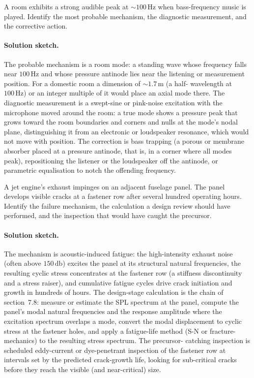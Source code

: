 \begin{exercise}
A room exhibits a strong audible peak at $\sim 100\,\si{\hertz}$
when bass-frequency music is played. Identify the most probable
mechanism, the diagnostic measurement, and the corrective action.
\paragraph{Solution sketch.} The probable mechanism is a room mode: a
standing wave whose frequency falls near $100\,\si{\hertz}$ and whose
pressure antinode lies near the listening or measurement position. For
a domestic room a dimension of $\sim 1.7\,\si{\meter}$ (a half-
wavelength at $100\,\si{\hertz}$) or an integer multiple of it would
place an axial mode there. The diagnostic measurement is a swept-sine
or pink-noise excitation with the microphone moved around the room: a
true mode shows a pressure peak that grows toward the room boundaries
and corners and nulls at the mode's nodal plane, distinguishing it
from an electronic or loudspeaker resonance, which would not move with
position. The correction is bass trapping (a porous or membrane
absorber placed at a pressure antinode, that is, in a corner where all
modes peak), repositioning the listener or the loudspeaker off the
antinode, or parametric equalisation to notch the offending frequency.
\end{exercise}

\begin{exercise}
A jet engine's exhaust impinges on an adjacent fuselage panel. The
panel develops visible cracks at a fastener row after several
hundred operating hours. Identify the failure mechanism, the
calculation a design review should have performed, and the
inspection that would have caught the precursor.
\paragraph{Solution sketch.} The mechanism is acoustic-induced
fatigue: the high-intensity exhaust noise (often above
$150\,\si{\decibel}$) excites the panel at its structural natural
frequencies, the resulting cyclic stress concentrates at the fastener
row (a stiffness discontinuity and a stress raiser), and cumulative
fatigue cycles drive crack initiation and growth in hundreds of hours.
The design-stage calculation is the chain of section~7.8: measure or
estimate the SPL spectrum at the panel, compute the panel's modal
natural frequencies and the response amplitude where the excitation
spectrum overlaps a mode, convert the modal displacement to cyclic
stress at the fastener holes, and apply a fatigue-life method (S-N or
fracture-mechanics) to the resulting stress spectrum. The precursor-
catching inspection is scheduled eddy-current or dye-penetrant
inspection of the fastener row at intervals set by the predicted
crack-growth life, looking for sub-critical cracks before they reach
the visible (and near-critical) size.
\end{exercise}

